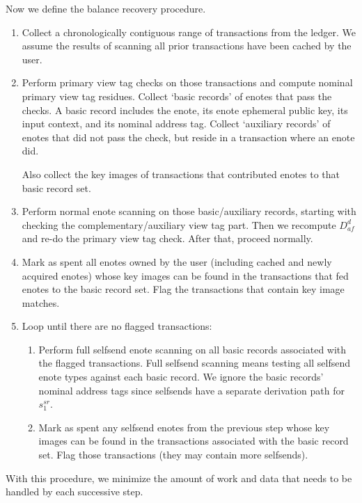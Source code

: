 Now we define the balance recovery procedure.
\begin{enumerate}
    \item Collect a chronologically contiguous range of transactions from the ledger. We assume the results of scanning all prior transactions have been cached by the user.

    \item Perform primary view tag checks on those transactions and compute nominal primary view tag residues. Collect `basic records' of enotes that pass the checks. A basic record includes the enote, its enote ephemeral public key, its input context, and its nominal address tag. Collect `auxiliary records' of enotes that did not pass the check, but reside in a transaction where an enote did.

    Also collect the key images of transactions that contributed enotes to that basic record set.

    \item Perform normal enote scanning on those basic/auxiliary records, starting with checking the complementary/auxiliary view tag part. Then we recompute $D^d_{af}$ and re-do the primary view tag check. After that, proceed normally.

    \item Mark as spent all enotes owned by the user (including cached and newly acquired enotes) whose key images can be found in the transactions that fed enotes to the basic record set. Flag the transactions that contain key image matches.

    \item Loop until there are no flagged transactions:
    \begin{enumerate}
        \item Perform full selfsend enote scanning on all basic records associated with the flagged transactions. Full selfsend scanning means testing all selfsend enote types against each basic record. We ignore the basic records' nominal address tags since selfsends have a separate derivation path for $s^{sr}_1$.
        \item Mark as spent any selfsend enotes from the previous step whose key images can be found in the transactions associated with the basic record set. Flag those transactions (they may contain more selfsends).
    \end{enumerate}
\end{enumerate}

With this procedure, we minimize the amount of work and data that needs to be handled by each successive step.


